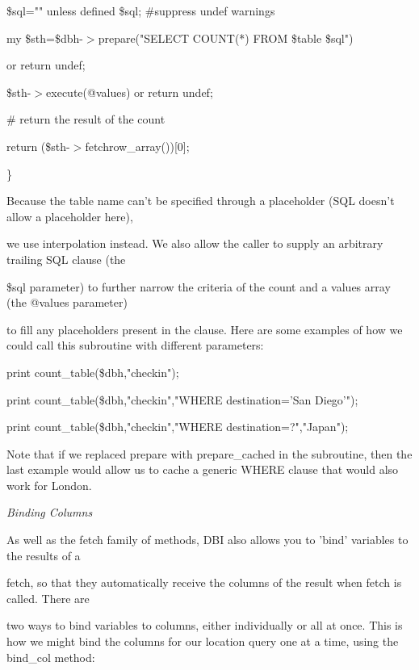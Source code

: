\documentclass[a4paper,11pt]{book}
\begin{document}
\noindent 

\noindent \$sql="" unless defined \$sql; \#suppress undef warnings

\noindent my \$sth=\$dbh-$>$prepare("SELECT COUNT(*) FROM \$table \$sql")

\noindent or return undef;

\noindent \$sth-$>$execute(@values) or return undef;

\noindent 

\noindent \# return the result of the count

\noindent return (\$sth-$>$fetchrow\_array())[0];

\noindent \}

\noindent 

\noindent Because the table name can't be specified through a placeholder (SQL doesn't allow a placeholder here),

\noindent we use interpolation instead. We also allow the caller to supply an arbitrary trailing SQL clause (the

\noindent \$sql parameter) to further narrow the criteria of the count and a values array (the @values parameter)

\noindent to fill any placeholders present in the clause. Here are some examples of how we could call this subroutine with different parameters:

\noindent 

\noindent print count\_table(\$dbh,"checkin");

\noindent print count\_table(\$dbh,"checkin","WHERE destination='San Diego'");

\noindent print count\_table(\$dbh,"checkin","WHERE destination=?","Japan");

\noindent 

\noindent Note that if we replaced prepare with prepare\_cached in the subroutine, then the last example would allow us to cache a generic WHERE clause that would also work for London.

\noindent 

\noindent \textit{Binding Columns}

\noindent As well as the fetch family of methods, DBI also allows you to 'bind' variables to the results of a

\noindent fetch, so that they automatically receive the columns of the result when fetch is called. There are

\noindent two ways to bind variables to columns, either individually or all at once. This is how we might bind the columns for our location query one at a time, using the bind\_col method:
\end{document}
